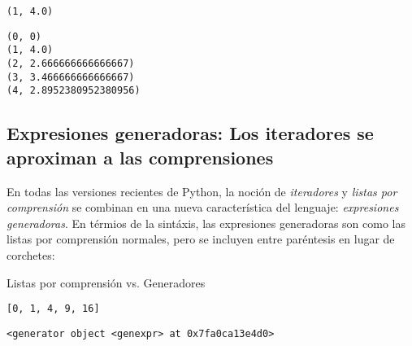 \begin{code}
\begin{verbatim}
(1, 4.0)
\end{verbatim}

\begin{Shaded}
\begin{Highlighting}[]
\OperatorTok{=} \NormalTok{(}\NormalTok{(}\NormalTok{))}
\OperatorTok{=}

 
    \NormalTok{(}
\end{Highlighting}
\end{Shaded}

\begin{verbatim}
(0, 0)
(1, 4.0)
(2, 2.666666666666667)
(3, 3.466666666666667)
(4, 2.8952380952380956)
\end{verbatim}
\end{code}

\subsection{Expresiones generadoras: Los iteradores se aproximan a las comprensiones}

En todas las versiones recientes de Python, la noción de
\emph{iteradores} y \emph{listas por comprensión} se combinan en una
nueva característica del lenguaje: \emph{expresiones generadoras}. En
térmios de la sintáxis, las expresiones generadoras son como las listas
por comprensión normales, pero se incluyen entre paréntesis en lugar de
corchetes: \\

\begin{code} Listas por comprensión vs. Generadores

\begin{Shaded}
\begin{Highlighting}[]
\NormalTok{[x}\OperatorTok{**}  \NormalTok{(}\NormalTok{)]}
\end{Highlighting}
\end{Shaded}

\begin{verbatim}
[0, 1, 4, 9, 16]
\end{verbatim}

\begin{Shaded}
\begin{Highlighting}[]
\OperatorTok{**}  \NormalTok{(}\NormalTok{))}
\end{Highlighting}
\end{Shaded}

\begin{verbatim}
<generator object <genexpr> at 0x7fa0ca13e4d0>

\end{verbatim}
\end{code}


